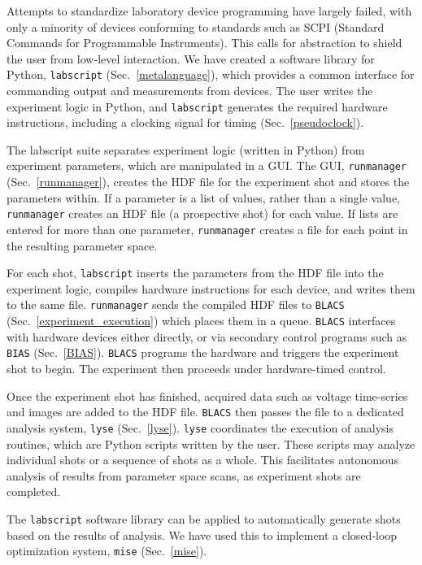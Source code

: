 Attempts to standardize laboratory device programming have largely failed, with only a minority of devices conforming to standards such as SCPI (Standard Commands for
Programmable Instruments).\cite{scpi}
This calls for abstraction to shield the user from low-level interaction.
We have created a software library for Python\cite{rossum_python,hughes_real_2010}, \texttt{labscript} (Sec.~\ref{metalanguage}), which provides a common interface for commanding output and measurements from devices.
The user writes the experiment logic in Python, and \texttt{labscript}
generates the required hardware instructions, including a clocking signal for timing (Sec.~\ref{pseudoclock}).

The labscript suite separates experiment logic (written in Python) from experiment parameters, which are manipulated in a GUI.
The GUI, \texttt{runmanager} (Sec.~\ref{runmanager}), creates the HDF file for the experiment shot and stores the parameters within.
If a parameter is a list of values, rather than a single value, \texttt{runmanager} creates an HDF file (a prospective shot) for each value.
If lists are entered for more than one parameter, \texttt{runmanager} creates a file for each point in the resulting parameter space.

For each shot, \texttt{labscript} inserts the parameters from the HDF file into the experiment logic, compiles hardware instructions for each device, and writes them to the same file.
\texttt{runmanager} sends the compiled HDF files to \texttt{BLACS} (Sec.~\ref{experiment_execution}) which places them in a queue.
\texttt{BLACS} interfaces with hardware devices either directly, or via secondary control programs such as \texttt{BIAS} (Sec.~\ref{BIAS}).
\texttt{BLACS} programs the hardware and triggers the experiment shot to begin.
The experiment then proceeds under hardware-timed control.

Once the experiment shot has finished, acquired data such as voltage time-series and images are added to the HDF file.
\texttt{BLACS} then passes the file to a dedicated analysis system, \texttt{lyse} (Sec.~\ref{lyse}).
\texttt{lyse} coordinates the execution of analysis routines, which are Python scripts written by the user.
These scripts may analyze individual shots or a sequence of shots as a whole.
This facilitates autonomous analysis of results from parameter space scans, as experiment shots are completed.

The \texttt{labscript} software library can be applied to automatically generate shots based on the results of analysis.
We have used this to implement a closed-loop optimization system, \texttt{mise} (Sec.~\ref{mise}).

